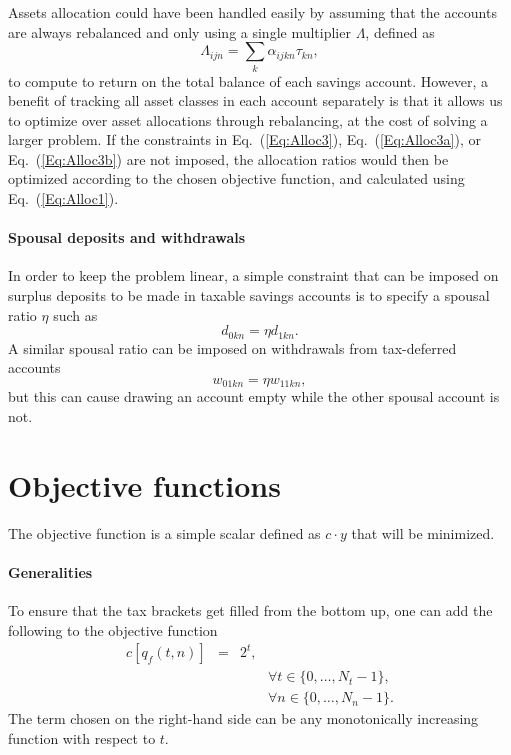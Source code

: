 \documentclass{article}[fleqn,12pt]
\begin{document}
Assets allocation could have been handled easily by assuming that
the accounts are always rebalanced
and only using a single multiplier $\Lambda$, defined as
\begin{equation}
	\Lambda_{ijn} = \sum_k \alpha_{ijkn}\tau_{kn},
\end{equation}
to compute to return
on the total balance of each savings account.
However, a benefit of tracking all asset classes in each account separately
is that it allows us to optimize over asset allocations through rebalancing, at
the cost of solving a larger problem. If the constraints in Eq.~(\ref{Eq:Alloc3}),
Eq.~(\ref{Eq:Alloc3a}), or Eq.~(\ref{Eq:Alloc3b})
are not imposed, the allocation ratios would then be optimized according to
the chosen objective function, and calculated using Eq.~(\ref{Eq:Alloc1}).

\paragraph*{Spousal deposits and withdrawals}
In order to keep the problem linear, a simple constraint that can be imposed on
surplus deposits to be made in taxable savings accounts is to specify a spousal ratio $\eta$
such as
\begin{equation}
	d_{0kn} = \eta d_{1kn}.
\end{equation}
A similar spousal ratio can be imposed on withdrawals from tax-deferred accounts
\begin{equation}
	w_{01kn} = \eta w_{11kn},
\end{equation}
but this can cause drawing an account empty while the other spousal account is not.

\section{Objective functions}
The objective function is a simple scalar defined as $c\cdot y$ that will be minimized.
\paragraph*{Generalities}
To ensure that the tax brackets get filled from the bottom up, one can add the following to
the objective function
\begin{eqnarray}
	c[q_f(t, n)] &=& 2^{t},\\
	&&\qquad\forall t \in \{0,\ldots, N_t-1\},\nonumber\\
	&&\qquad\forall n \in \{0,\ldots, N_n-1\}.\nonumber
\end{eqnarray}
The term chosen on the right-hand side can be any monotonically increasing function with
respect to $t$.
\end{document}

